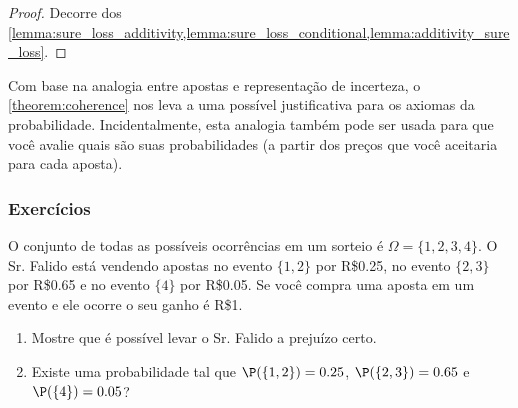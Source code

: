 \begin{proof}
 Decorre dos \cref{lemma:sure_loss_additivity,lemma:sure_loss_conditional,lemma:additivity_sure_loss}.
\end{proof}

Com base na analogia entre apostas e 
representação de incerteza, o 
\cref{theorem:coherence} nos leva a 
uma possível justificativa para os 
axiomas da probabilidade.
Incidentalmente, esta analogia também 
pode ser usada para que 
você avalie quais são suas probabilidades
(a partir dos preços que 
você aceitaria para cada aposta).

\subsubsection*{Exercícios}

\begin{exercise}
 \normalfont
 O conjunto de todas as possíveis ocorrências em
 um sorteio é $\Omega=\{1,2,3,4\}$.
 O Sr. Falido está vendendo apostas no 
 evento $\{1,2\}$ por R\$0.25,
 no evento $\{2,3\}$ por R\$0.65 e 
 no evento $\{4\}$ por R\$0.05.
 Se você compra uma aposta em um evento e
 ele ocorre o seu ganho é R\$1.
 \begin{enumerate}[label=(\alph*)]
  \item Mostre que é possível levar 
  o Sr. Falido a prejuízo certo.
  \item Existe uma probabilidade tal que 
  $\P(\{1,2\}) = 0.25$, $\P(\{2,3\})=0.65$ e 
  $\P(\{4\})=0.05$?
 \end{enumerate}
\end{exercise}


